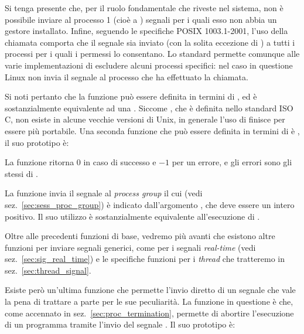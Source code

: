 Si tenga presente che, per il ruolo fondamentale che riveste nel sistema, non
è possibile inviare al processo 1 (cioè a ) segnali per i quali esso
non abbia un gestore installato.  Infine, seguendo le specifiche POSIX
1003.1-2001, l'uso della chiamata  comporta che il segnale
sia inviato (con la solita eccezione di ) a tutti i processi per i
quali i permessi lo consentano. Lo standard permette comunque alle varie
implementazioni di escludere alcuni processi specifici: nel caso in questione
Linux non invia il segnale al processo che ha effettuato la chiamata.

Si noti pertanto che la funzione  può essere definita in
termini di , ed è sostanzialmente equivalente ad una
. Siccome , che è definita nello
standard ISO C, non esiste in alcune vecchie versioni di Unix, in generale
l'uso di  finisce per essere più portabile.  Una seconda funzione
che può essere definita in termini di  è , il suo
prototipo è:

\begin{funcproto}{
}

{ La funzione ritorna $0$ in caso di successo e $-1$ per un errore, e gli
  errori sono gli stessi di .
}
\end{funcproto}


La funzione invia il segnale  al \textit{process group} il cui
 (vedi sez.~\ref{sec:sess_proc_group}) è indicato
dall'argomento , che deve essere un intero positivo. Il suo
utilizzo è sostanzialmente equivalente all'esecuzione di .

Oltre alle precedenti funzioni di base, vedremo più avanti che esistono altre
funzioni per inviare segnali generici, come  per i segnali
\textit{real-time} (vedi sez.~\ref{sec:sig_real_time}) e le specifiche
funzioni per i \textit{thread} che tratteremo in sez.~\ref{sec:thread_signal}.

Esiste però un'ultima funzione che permette l'invio diretto di un segnale che
vale la pena di trattare a parte per le sue peculiarità. La funzione in
questione è  che, come accennato in
sez.~\ref{sec:proc_termination}, permette di abortire l'esecuzione di un
programma tramite l'invio del segnale . Il suo prototipo è:

